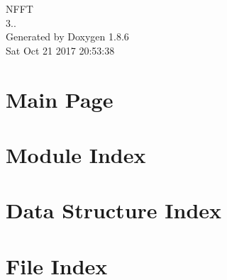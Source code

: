 \documentclass[twoside]{book}
\newcommand{\clearemptydoublepage}{%
  \newpage{\pagestyle{empty}\cleardoublepage}%
}
\begin{document}
\hypersetup{pageanchor=false}
\begin{titlepage}
\vspace*{7cm}
\begin{center}%
{\Large N\-F\-F\-T \\[1ex]\large 3.. }\\
\vspace*{1cm}
{\large Generated by Doxygen 1.8.6}\\
\vspace*{0.5cm}
{\small Sat Oct 21 2017 20:53:38}\\
\end{center}
\end{titlepage}
\clearemptydoublepage
\tableofcontents
\clearemptydoublepage
{}
\hypersetup{pageanchor=true}

\chapter{Main Page}
\label{index}\hypertarget{index}{}
\chapter{Module Index}

\chapter{Data Structure Index}

\chapter{File Index}

\end{document}
